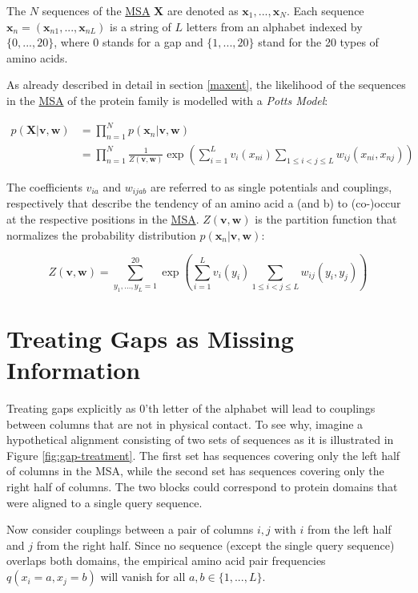 \documentclass[12pt,a4paper,twoside]{book}
\newcommand{\seq}{\mathbf{x}}
\renewcommand{\v}{\mathbf{v}}
\newcommand{\via}{v_{ia}}
\newcommand{\w}{\mathbf{w}}
\newcommand{\wijab}{w_{ijab}}
\newcommand{\X}{\mathbf{X}}
\theoremstyle{definition}
\theoremstyle{definition}
\theoremstyle{remark}
\begin{document}
The \(N\) sequences of the \protect\hyperlink{abbrev}{MSA} \(\X\) are
denoted as \({\seq_1, ..., \seq_N}\). Each sequence
\(\seq_n = (\seq_{n1}, ..., \seq_{nL})\) is a string of \(L\) letters
from an alphabet indexed by \(\{0, ..., 20\}\), where 0 stands for a gap
and \(\{1, ... , 20\}\) stand for the 20 types of amino acids.

As already described in detail in section \ref{maxent}, the likelihood
of the sequences in the \protect\hyperlink{abbrev}{MSA} of the protein
family is modelled with a \emph{Potts Model}:

\begin{align}
    p(\X | \v, \w) &= \prod_{n=1}^N p(\seq_n | \v, \w) \nonumber \\
                   &= \prod_{n=1}^N \frac{1}{Z(\v, \w)} \exp \left( \sum_{i=1}^L v_i(x_{ni}) \sum_{1 \leq i < j \leq L} w_{ij}(x_{ni}, x_{nj}) \right)
\end{align}

The coefficients \(\via\) and \(\wijab\) are referred to as single
potentials and couplings, respectively that describe the tendency of an
amino acid a (and b) to (co-)occur at the respective positions in the
\protect\hyperlink{abbrev}{MSA}. \(Z(\v, \w)\) is the partition function
that normalizes the probability distribution \(p(\seq_n |\v, \w)\):

\begin{equation}
  Z(\v, \w) = \sum_{y_1, ..., y_L = 1}^{20} \exp \left( \sum_{i=1}^L v_i(y_i) \sum_{1 \leq i < j \leq L} w_{ij}(y_i, y_j)  \right)
\end{equation}

\section{Treating Gaps as Missing Information}\label{gap-treatment}

Treating gaps explicitly as 0'th letter of the alphabet will lead to
couplings between columns that are not in physical contact. To see why,
imagine a hypothetical alignment consisting of two sets of sequences as
it is illustrated in Figure \ref{fig:gap-treatment}. The first set has
sequences covering only the left half of columns in the MSA, while the
second set has sequences covering only the right half of columns. The
two blocks could correspond to protein domains that were aligned to a
single query sequence.

Now consider couplings between a pair of columns \(i, j\) with \(i\)
from the left half and \(j\) from the right half. Since no sequence
(except the single query sequence) overlaps both domains, the empirical
amino acid pair frequencies \(q(x_i = a, x_j = b)\) will vanish for all
\(a, b \in \{1,... , L\}\).
\end{document}
